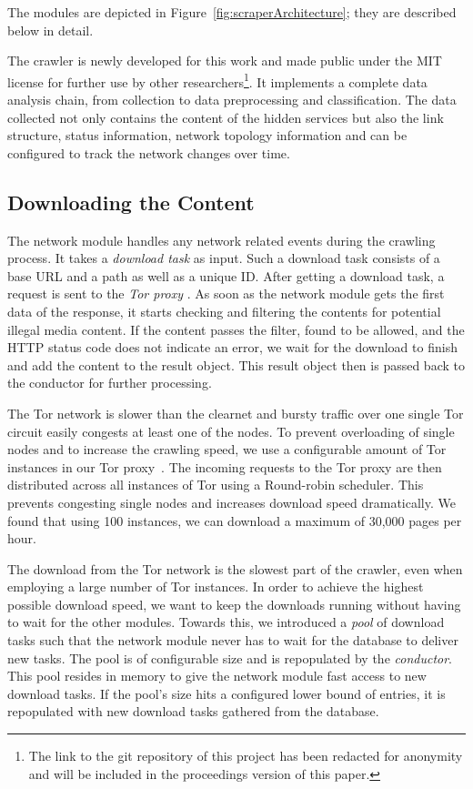 The modules are depicted in Figure~\ref{fig:scraperArchitecture}; they are described below in detail.

The crawler is newly developed for this work and made public under the MIT license for further use by other researchers\footnote{The link to the git repository of this project has been redacted for anonymity and will be included in the proceedings version of this paper.}. It implements a complete data analysis chain, from collection to data preprocessing and classification. The data collected not only contains the content of the hidden services but also the link structure, status information, network topology information and can be configured to track the network changes over time.
%
%
\subsection{Downloading the Content}
\label{sec:MIMEType}
The network module handles any network related events during the crawling process. It takes a \emph{download task} as input. Such a download task consists of a base URL and a path as well as a unique ID. After getting a download task, a request is sent to the \emph{Tor proxy} \cite{Boyd}. As soon as the network module gets the first data of the response, it starts checking and filtering the contents for potential illegal media content. If the content passes the filter, found to be allowed, and the HTTP status code does not indicate an error, we wait for the download to finish and add the content to the result object. This result object then is passed back to the conductor for further processing.

The Tor network is slower than the clearnet \cite{TorMetricsPerformance} and bursty traffic over one single Tor circuit easily congests at least one of the nodes. To prevent overloading of single nodes and to increase the crawling speed, we use a configurable amount of Tor instances in our Tor proxy~\cite{Boyd}. The incoming requests to the Tor proxy are then distributed across all instances of Tor using a Round-robin scheduler. This prevents congesting single nodes and increases download speed dramatically. We found that using 100 instances, we can download a maximum of 30,000 pages per hour.

The download from the Tor network is the slowest part of the crawler, even when employing a large number of Tor instances. In order to achieve the highest possible download speed, we want to keep the downloads running without having to wait for the other modules. Towards this, we introduced a \emph{pool} of download tasks such that the network module never has to wait for the database to deliver new tasks. The pool is of configurable size and is repopulated by the \emph{conductor}. This pool resides in memory to give the network module fast access to new download tasks. If the pool's size hits a configured lower bound of entries, it is repopulated with new download tasks gathered from the database.

